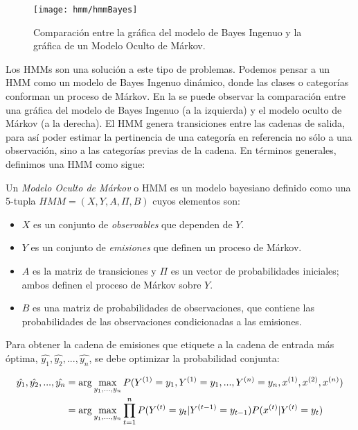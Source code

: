 \begin{figure}
 \centering
 \texttt{[image: hmm/hmmBayes]}
 \caption{Comparación entre la gráfica del modelo de Bayes Ingenuo y la gráfica de un Modelo Oculto de Márkov.}\label{Fig:BayesMárkov}
\end{figure}

Los HMMs son una solución a este tipo de problemas. Podemos pensar a un HMM como un modelo de Bayes Ingenuo dinámico, donde las clases o categorías conforman un proceso de Márkov. En la  se puede observar la comparación entre una gráfica del modelo de Bayes Ingenuo (a la izquierda) y el modelo oculto de Márkov (a la derecha). El HMM genera transiciones entre las cadenas de salida, para así poder estimar la pertinencia de una categoría en referencia no sólo a una observación, sino a las categorías previas de la cadena. En términos generales, definimos una HMM como sigue:


\begin{definition}
  Un \emph{Modelo Oculto de Márkov} o HMM es un modelo bayesiano definido como una 5-tupla $HMM = (X, Y, A, \Pi, B)$ cuyos elementos son:

\begin{itemize}
    \item $X$ es un conjunto de \emph{observables} que dependen de $Y$.
    \item  $Y$ es un conjunto de \emph{emisiones} que definen un proceso de Márkov.
    \item $A$ es la matriz de transiciones y $\Pi$ es un vector de probabilidades iniciales; ambos definen el proceso de Márkov sobre $Y$.
    \item $B$ es una matriz de probabilidades de observaciones, que contiene las probabilidades de las observaciones condicionadas a las emisiones.
  \end{itemize}
\end{definition}

Para obtener la cadena de emisiones que etiquete a la cadena de entrada más óptima, $\hat{y_1}, \hat{y_2}, ... , \hat{y_n}$, se debe optimizar la probabilidad conjunta:

\begin{align} 
    \small
    \hat{y_1}, \hat{y_2}, ... , \hat{y_n} &= \arg\max_{y_1,...,y_n} P(Y^{(1)}=y_1, Y^{(1)}=y_1,...,Y^{(n)}=y_n, x^{(1)}, x^{(2)}, x^{(n)}) \\
    &= \arg\max_{y_1,...,y_n} \prod_{t=1}^n P(Y^{(t)}=y_t | Y^{(t-1)}=y_{t-1}) P(x^{(t)}|Y^{(t)}=y_t) \label{eq:HMM}
\end{align}

